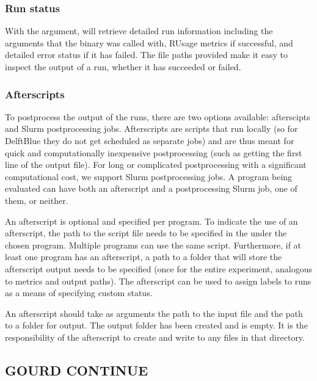 \documentclass[a4paper,english]{article}
\begin{document}
\begin{adjustwidth}{18pt}{0pt}
            \subsubsection{Run status}
                With the  argument,   will retrieve detailed
                run information including the arguments that the binary was called with, RUsage metrics
                if successful, and detailed error status if it has failed.
                The file paths provided make it easy to inspect the output of a run, whether it has
                succeeded or failed.

            \subsubsection{Afterscripts}
                To postprocess the output of the runs, there are two options available: afterscipts and Slurm
                postprocessing jobs. Afterscripts are scripts that run locally (so for DelftBlue they do not
                get scheduled as separate jobs) and are thus meant for quick and computationally inexpensive postprocessing
                (such as getting the first line of the output file). For long or complicated postprocessing
                with a significant computational cost, we support Slurm postprocessing jobs. A program being
                evaluated can have both an afterscript and a postprocessing Slurm job, one of them, or neither.

                An afterscript is optional and specified per program. To indicate the use of an afterscript,
                the path to the script file needs to be specified in the  under the chosen program.
                Multiple programs can use the same script. Furthermore, if at least one program has an
                afterscript, a path to a folder that will store the afterscript output needs to be specified
                (once for the entire experiment, analogous to metrics and output paths). The afterscript can
                be used to assign labels to runs as a means of specifying custom status.

                An afterscript should take as arguments the path to the input file and the path to a folder
                for output. The output folder has been created and is empty. It is the responsibility of the
                afterscript to create and write to any files in that directory.

        \subsection{GOURD CONTINUE}


\end{adjustwidth}
\end{document}
